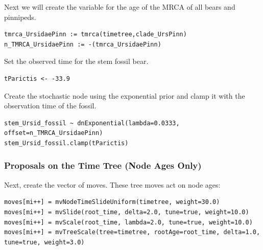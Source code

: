 Next we will create the variable for the age of the MRCA of all bears and pinnipeds.
{\tt \begin{snugshade*}
\begin{lstlisting}
tmrca_UrsidaePinn := tmrca(timetree,clade_UrsPinn)
n_TMRCA_UrsidaePinn := -(tmrca_UrsidaePinn)
\end{lstlisting}
\end{snugshade*}}

Set the observed time for the stem fossil bear.
{\tt \begin{snugshade*}
\begin{lstlisting}
tParictis <- -33.9
\end{lstlisting}
\end{snugshade*}}

Create the stochastic node using the exponential prior and clamp it with the observation time of the fossil.
{\tt \begin{snugshade*}
\begin{lstlisting}
stem_Ursid_fossil ~ dnExponential(lambda=0.0333, offset=n_TMRCA_UrsidaePinn)
stem_Ursid_fossil.clamp(tParictis)
\end{lstlisting}
\end{snugshade*}}

\subsubsection{Proposals on the Time Tree (Node Ages Only)}

Next, create the vector of moves. These tree moves act on node ages:
{\tt \begin{snugshade*}
\begin{lstlisting}
moves[mi++] = mvNodeTimeSlideUniform(timetree, weight=30.0)
moves[mi++] = mvSlide(root_time, delta=2.0, tune=true, weight=10.0)
moves[mi++] = mvScale(root_time, lambda=2.0, tune=true, weight=10.0)
moves[mi++] = mvTreeScale(tree=timetree, rootAge=root_time, delta=1.0, tune=true, weight=3.0)
\end{lstlisting}
\end{snugshade*}}

%

